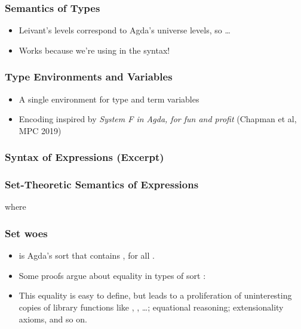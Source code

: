 \documentclass[dvipsnames,aspectratio=169,pdftex]{beamer}
\begin{document}
\begin{frame}
  \frametitle{Semantics of Types}
  \begin{itemize}
  \item Leivant's levels correspond to Agda's universe levels, so \dots
  \end{itemize}
  \pause
  \TFTEnvP
  \pause\vspace{-2\baselineskip}
  \TFTSemP
  \begin{itemize}
  \item Works because we're using  in the syntax!
  \end{itemize}
\end{frame}
\begin{frame}
  \frametitle{Type Environments and Variables}
  \begin{itemize}
  \item A single environment for type and term variables
  \item Encoding inspired by \emph{System F in Agda, for fun and profit} (Chapman et al, MPC 2019)
  \end{itemize}
  \TFTVEnv
  \pause\vspace{-2\baselineskip}
  \TFCleanerinn
\end{frame}
\begin{frame}
  \frametitle{Syntax of Expressions (Excerpt)}
  \TFCleanExpr
\end{frame}
\begin{frame}
  \frametitle{Set-Theoretic Semantics of Expressions}
  \TFExprSem
  where
  \TFVEnv
\end{frame}
\begin{frame}
  \frametitle{Set woes}
  \begin{itemize}
  \item {} is Agda's sort that contains , for all .
  \item Some proofs argue about equality in types of sort :
    \TFSingleSubstPreserves
  \item This equality is easy to define, but leads to a proliferation of uninteresting copies of library functions like , , \dots; equational reasoning; extensionality axioms, and so on.
  \end{itemize}
\end{frame}
\end{document}
